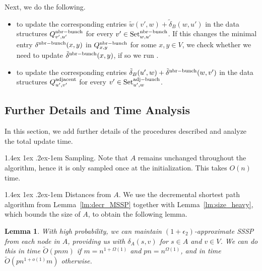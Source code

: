 \documentclass[11pt]{article}
\makeatletter
\newtheorem{lemma}[theorem]{Lemma}
\theoremstyle{definition}
\theoremstyle{remark}
\renewcommand{\paragraph}{%
  \@startsection{paragraph}{4}%
  {\z@}{1.4ex \@plus 1ex \@minus .2ex}{-1em}%
  {\normalfont\normalsize\bfseries}%
}
\makeatother
\begin{document}
    Next, we do the following. 
    \begin{itemize}
        \item {} to update the corresponding entries $\tilde w(v',w)+\tilde\delta_B(w,u')$ in the data structures $Q^{\rm{nbr-bunch}}_{v',u'}$ for every $v'\in \text{Set}^{\rm{nbr-bunch}}_{w,u'}$. If this changes the minimal entry $\delta^{\rm{nbr-bunch}}(x,y)$ in $Q^{\rm{nbr-bunch}}_{x,y}$ for some $x,y\in V$, we check whether we need to update $\tilde \delta^{\rm{nbr-bunch}}(x,y)$, if so we run . %
        \item {} to update the corresponding entries $\tilde\delta_B(u',w)+\tilde\delta^{\rm{nbr-bunch}}(w,v')$ in the data structures $Q^{\rm{adjacent}}_{u',v'}$ for every $v'\in \text{Set}^{\rm{adj-bunch}}_{u',w}$.
    \end{itemize}


\subsection{Further Details and Time Analysis}\label{sc:mult_time}
In this section, we add further details of the procedures described and analyze the total update time. 

\paragraph{Sampling.} Note that $A$ remains unchanged throughout the algorithm, hence it is only sampled once at the initialization. This takes $O(n)$ time. 

\paragraph{Distances from $A$.} We use the decremental shortest path algorithm from Lemma~\ref{lm:decr_MSSP} together with Lemma~\ref{lm:size_heavy}, which bounds the size of $A$, to obtain the following lemma. 

\begin{lemma}\label{lm:A_MSSP}
    With high probability, we can maintain $(1+\epsilon_2)$-approximate SSSP from each node in $A$, providing us with $\delta_A(s,v)$ for $s\in A$ and $v\in V$. We can do this in time $\tilde{O}(pnm)$ if $m=n^{1+\Omega(1)}$ and $pn=n^{\Omega(1)}$, and in time $\tilde O(pn^{1+o(1)}m)$ otherwise.
\end{lemma}
\end{document}
